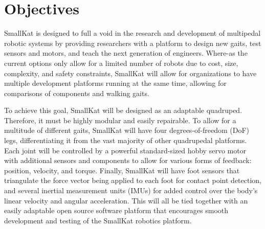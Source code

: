 



\section{Objectives}
SmallKat is designed to full a void in the research and development of multipedal robotic systems by providing researchers with a platform to design new gaits, test sensors and motors, and teach the next generation of engineers. Where-as the current options only allow for a limited number of robots due to cost,  size, complexity, and safety constraints, SmallKat will allow for organizations to have multiple development platforms running at  the  same time,  allowing  for comparisons of components and walking gaits.

To achieve this goal, SmallKat will be designed as an adaptable quadruped. Therefore, it must be highly modular and easily repairable. To allow for a multitude of different gaits, SmallKat will have four degrees-of-freedom (DoF) legs, differentiating it from the vast majority of other quadrupedal platforms. Each joint will be controlled by a powerful standard-sized hobby servo motor with additional sensors and components to allow for various forms of feedback: position, velocity, and torque. Finally, SmallKat will have foot sensors that triangulate the force vector being applied to each foot for contact point detection, and several inertial measurement units (IMUs) for added control over the body's linear velocity and angular acceleration. This will all be tied together with an easily adaptable open source software platform that encourages smooth development and testing of the SmallKat robotics platform.

